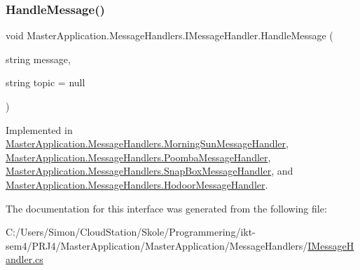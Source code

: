\subsubsection{\texorpdfstring{Handle\+Message()}{HandleMessage()}}
{\footnotesize\ttfamily void Master\+Application.\+Message\+Handlers.\+I\+Message\+Handler.\+Handle\+Message (\begin{DoxyParamCaption}\item[{string}]{message,  }\item[{string}]{topic = {\ttfamily null} }\end{DoxyParamCaption})}



Implemented in \mbox{\hyperlink{class_master_application_1_1_message_handlers_1_1_morning_sun_message_handler_a0e70245da3c7203ab5d1049fe0286c9f}{Master\+Application.\+Message\+Handlers.\+Morning\+Sun\+Message\+Handler}}, \mbox{\hyperlink{class_master_application_1_1_message_handlers_1_1_poomba_message_handler_a2c49a00a1f9cad8e67d799be49b476a2}{Master\+Application.\+Message\+Handlers.\+Poomba\+Message\+Handler}}, \mbox{\hyperlink{class_master_application_1_1_message_handlers_1_1_snap_box_message_handler_a83f2a6b8a014a225051ca8347a546539}{Master\+Application.\+Message\+Handlers.\+Snap\+Box\+Message\+Handler}}, and \mbox{\hyperlink{class_master_application_1_1_message_handlers_1_1_hodoor_message_handler_ae3bb33c825a5f9ca7941e56fe25cc3ae}{Master\+Application.\+Message\+Handlers.\+Hodoor\+Message\+Handler}}.



The documentation for this interface was generated from the following file\+:\begin{DoxyCompactItemize}
\item 
C\+:/\+Users/\+Simon/\+Cloud\+Station/\+Skole/\+Programmering/ikt-\/sem4/\+P\+R\+J4/\+Master\+Application/\+Master\+Application/\+Message\+Handlers/\mbox{\hyperlink{_i_message_handler_8cs}{I\+Message\+Handler.\+cs}}\end{DoxyCompactItemize}

